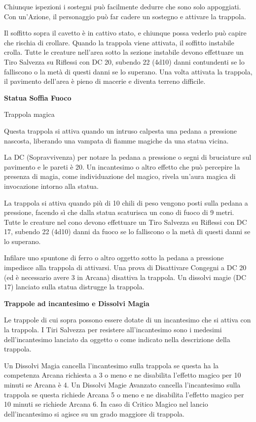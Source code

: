 \begin{multicols}{2}
Chiunque ispezioni i sostegni può facilmente dedurre che sono solo appoggiati. Con un'Azione, il personaggio può far cadere un sostegno e attivare la trappola.

Il soffitto sopra il cavetto è in cattivo stato, e chiunque possa vederlo può capire che rischia di crollare. Quando la trappola viene attivata, il soffitto instabile crolla. Tutte le creature nell'area sotto la sezione instabile devono effettuare un Tiro Salvezza su Riflessi con DC 20, subendo 22 (4d10) danni contundenti se lo falliscono o la metà di questi danni se lo superano. Una volta attivata la trappola, il pavimento dell'area è pieno di macerie e diventa terreno difficile.

\medskip

\textbf{Statua Soffia Fuoco}

Trappola magica

Questa trappola si attiva quando un intruso calpesta una pedana a pressione nascosta, liberando una vampata di fiamme magiche da una statua vicina.

La DC (Sopravvivenza) per notare la pedana a pressione o segni di bruciature sul pavimento e le pareti è 20. Un incantesimo o altro effetto che può percepire la presenza di magia, come individuazione del magico, rivela un'aura magica di invocazione intorno alla statua.

La trappola si attiva quando più di 10 chili di peso vengono posti sulla pedana a pressione, facendo sì che dalla statua scaturisca un cono di fuoco di 9 metri. Tutte le creature nel cono devono effettuare un Tiro Salvezza su Riflessi con DC 17, subendo 22 (4d10) danni da fuoco se lo falliscono o la metà di questi danni se lo superano.

Infilare uno spuntone di ferro o altro oggetto sotto la pedana a pressione impedisce alla trappola di attivarsi. Una prova di Disattivare Congegni a DC 20 (ed è necessario avere 3 in Arcana) disattiva la trappola. Un dissolvi magie (DC 17) lanciato sulla statua distrugge la trappola.

\medskip

\textbf{Trappole ad incantesimo e Dissolvi Magia}

Le trappole di cui sopra possono essere dotate di un incantesimo che si attiva con la trappola.
I Tiri Salvezza per resistere all'incantesimo sono i medesimi dell'incantesimo lanciato da oggetto o come indicato nella descrizione della trappola.

Un Dissolvi Magia cancella l'incantesimo sulla trappola se questa ha la competenza Arcana richiesta a 3 o meno e ne disabilita l'effetto magico per 10 minuti se Arcana è 4.
Un Dissolvi Magie Avanzato cancella l'incantesimo sulla trappola se questa richiede Arcana 5 o meno e ne disabilita l'effetto magico per 10 minuti se richiede Arcana 6. In caso di Critico Magico nel lancio dell'incantesimo si agisce su un grado maggiore di trappola.


\end{multicols}
